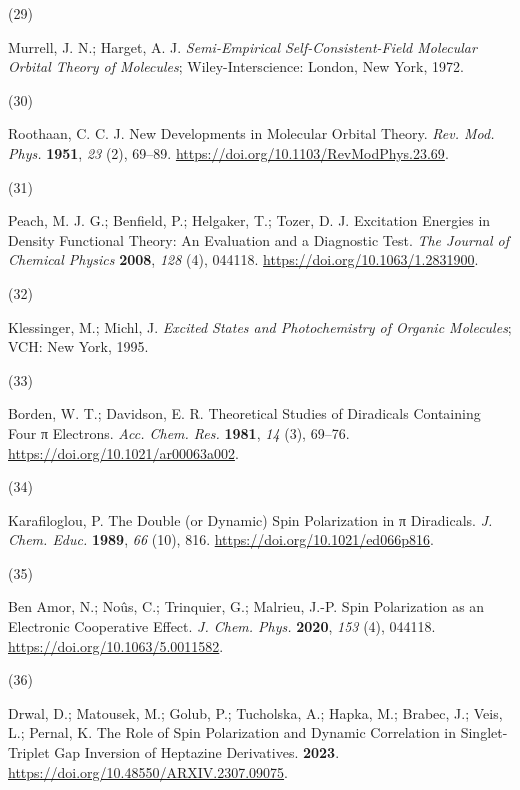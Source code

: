 \documentclass[
  number,
  3p]{elsarticle}
\newlength{\cslhangindent}
\newlength{\csllabelwidth}
\newlength{\cslentryspacingunit} %
\newenvironment{CSLReferences}[2] %
 {%
  \setlength{\parindent}{0pt}
  \ifodd #1
  \let\oldpar\par
  \def\par{\hangindent=\cslhangindent\oldpar}
  \fi
  \setlength{\parskip}{#2\cslentryspacingunit}
 }%
 {}
\newcommand{\CSLLeftMargin}[1]{\parbox[t]{\csllabelwidth}{#1}}
\newcommand{\CSLRightInline}[1]{\parbox[t]{\linewidth - \csllabelwidth}{#1}\break}
\begin{document}
\begin{CSLReferences}{0}{0}
\leavevmode{}%
\CSLLeftMargin{(29) }%
\CSLRightInline{Murrell, J. N.; Harget, A. J. \emph{Semi-Empirical
Self-Consistent-Field Molecular Orbital Theory of Molecules};
{Wiley-Interscience}: {London, New York}, 1972.}

\leavevmode{}%
\CSLLeftMargin{(30) }%
\CSLRightInline{Roothaan, C. C. J. New {Developments} in {Molecular
Orbital Theory}. \emph{Rev. Mod. Phys.} \textbf{1951}, \emph{23} (2),
69--89. \url{https://doi.org/10.1103/RevModPhys.23.69}.}

\leavevmode{}%
\CSLLeftMargin{(31) }%
\CSLRightInline{Peach, M. J. G.; Benfield, P.; Helgaker, T.; Tozer, D.
J. Excitation Energies in Density Functional Theory: {An} Evaluation and
a Diagnostic Test. \emph{The Journal of Chemical Physics} \textbf{2008},
\emph{128} (4), 044118. \url{https://doi.org/10.1063/1.2831900}.}

\leavevmode{}%
\CSLLeftMargin{(32) }%
\CSLRightInline{Klessinger, M.; Michl, J. \emph{Excited States and
Photochemistry of Organic Molecules}; {VCH}: {New York}, 1995.}

\leavevmode{}%
\CSLLeftMargin{(33) }%
\CSLRightInline{Borden, W. T.; Davidson, E. R. Theoretical Studies of
Diradicals Containing Four π Electrons. \emph{Acc. Chem. Res.}
\textbf{1981}, \emph{14} (3), 69--76.
\url{https://doi.org/10.1021/ar00063a002}.}

\leavevmode{}%
\CSLLeftMargin{(34) }%
\CSLRightInline{Karafiloglou, P. The Double (or Dynamic) Spin
Polarization in π Diradicals. \emph{J. Chem. Educ.} \textbf{1989},
\emph{66} (10), 816. \url{https://doi.org/10.1021/ed066p816}.}

\leavevmode{}%
\CSLLeftMargin{(35) }%
\CSLRightInline{Ben Amor, N.; Noûs, C.; Trinquier, G.; Malrieu, J.-P.
Spin Polarization as an Electronic Cooperative Effect. \emph{J. Chem.
Phys.} \textbf{2020}, \emph{153} (4), 044118.
\url{https://doi.org/10.1063/5.0011582}.}

\leavevmode{}%
\CSLLeftMargin{(36) }%
\CSLRightInline{Drwal, D.; Matousek, M.; Golub, P.; Tucholska, A.;
Hapka, M.; Brabec, J.; Veis, L.; Pernal, K. The Role of Spin
Polarization and Dynamic Correlation in Singlet-Triplet Gap Inversion of
Heptazine Derivatives. \textbf{2023}.
\url{https://doi.org/10.48550/ARXIV.2307.09075}.}


\end{CSLReferences}
\end{document}
